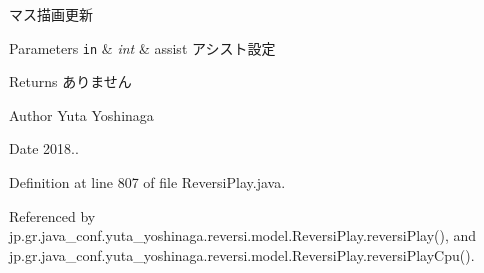 マス描画更新 


\begin{DoxyParams}[1]{Parameters}
\mbox{\tt in}  & {\em int} & assist アシスト設定 \\
\hline
\end{DoxyParams}
\begin{DoxyReturn}{Returns}
ありません 
\end{DoxyReturn}
\begin{DoxyAuthor}{Author}
Yuta Yoshinaga 
\end{DoxyAuthor}
\begin{DoxyDate}{Date}
2018.. 
\end{DoxyDate}


Definition at line 807 of file Reversi\+Play.\+java.



Referenced by jp.\+gr.\+java\+\_\+conf.\+yuta\+\_\+yoshinaga.\+reversi.\+model.\+Reversi\+Play.\+reversi\+Play(), and jp.\+gr.\+java\+\_\+conf.\+yuta\+\_\+yoshinaga.\+reversi.\+model.\+Reversi\+Play.\+reversi\+Play\+Cpu().

